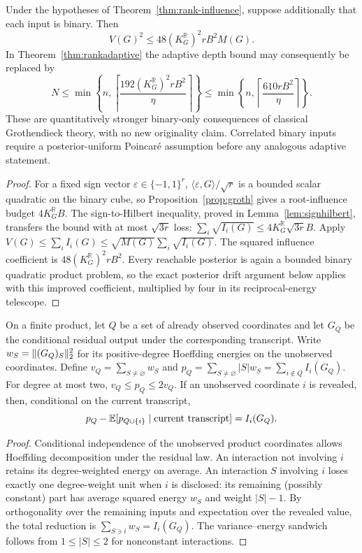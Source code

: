 \begin{corollary}\label{cor:binaryrank}
Under the hypotheses of Theorem~\ref{thm:rank-influence}, suppose additionally that each input is binary. Then
\[
 V(G)^2\le48(K_G^{\mathbb R})^2rB^2M(G).
\]
In Theorem~\ref{thm:rankadaptive} the adaptive depth bound may consequently be replaced by
\[
 N\le\min\left\{n,\left\lceil\frac{192(K_G^{\mathbb R})^2rB^2}{\eta}\right\rceil\right\}
 \le\min\left\{n,\left\lceil\frac{610rB^2}{\eta}\right\rceil\right\}.
\]
These are quantitatively stronger binary-only consequences of classical Grothendieck theory, with no new originality claim. Correlated binary inputs require a posterior-uniform Poincar\'e assumption before any analogous adaptive statement.
\end{corollary}
\begin{proof}
For a fixed sign vector $\varepsilon\in\{-1,1\}^r$, $\langle\varepsilon,G\rangle/\sqrt r$ is a bounded scalar quadratic on the binary cube, so Proposition~\ref{prop:groth} gives a root-influence budget $4K_G^{\mathbb R}B$. The sign-to-Hilbert inequality, proved in Lemma~\ref{lem:signhilbert}, transfers the bound with at most $\sqrt{3r}$ loss: $\sum_i\sqrt{I_i(G)}\le4K_G^{\mathbb R}\sqrt{3r}B$. Apply $V(G)\le\sum_iI_i(G)\le\sqrt{M(G)}\sum_i\sqrt{I_i(G)}$. The squared influence coefficient is $48(K_G^{\mathbb R})^2rB^2$. Every reachable posterior is again a bounded binary quadratic product problem, so the exact posterior drift argument below applies with this improved coefficient, multiplied by four in its reciprocal-energy telescope.
\end{proof}

\begin{lemma}\label{lem:posterdelta}
On a finite product, let $Q$ be a set of already observed coordinates and let $G_Q$ be the conditional residual output under the corresponding transcript. Write $w_S=\lVert (G_Q)_S\rVert_2^2$ for its positive-degree Hoeffding energies on the unobserved coordinates. Define $v_Q=\sum_{S\ne\varnothing}w_S$ and $p_Q=\sum_{S\ne\varnothing}|S|w_S=\sum_{i\notin Q}I_i(G_Q)$. For degree at most two, $v_Q\le p_Q\le2v_Q$. If an unobserved coordinate $i$ is revealed, then, conditional on the current transcript,
\begin{equation}\label{eq:posterior-drift-exact}
 p_Q-\mathbb E[p_{Q\cup\{i\}}\mid\text{current transcript}]=I_i(G_Q).
\end{equation}
\end{lemma}
\begin{proof}
Conditional independence of the unobserved product coordinates allows Hoeffding decomposition under the residual law. An interaction not involving $i$ retains its degree-weighted energy on average. An interaction $S$ involving $i$ loses exactly one degree-weight unit when $i$ is disclosed: its remaining (possibly constant) part has average squared energy $w_S$ and weight $|S|-1$. By orthogonality over the remaining inputs and expectation over the revealed value, the total reduction is $\sum_{S\ni i}w_S=I_i(G_Q)$. The variance--energy sandwich follows from $1\le|S|\le2$ for nonconstant interactions.
\end{proof}


